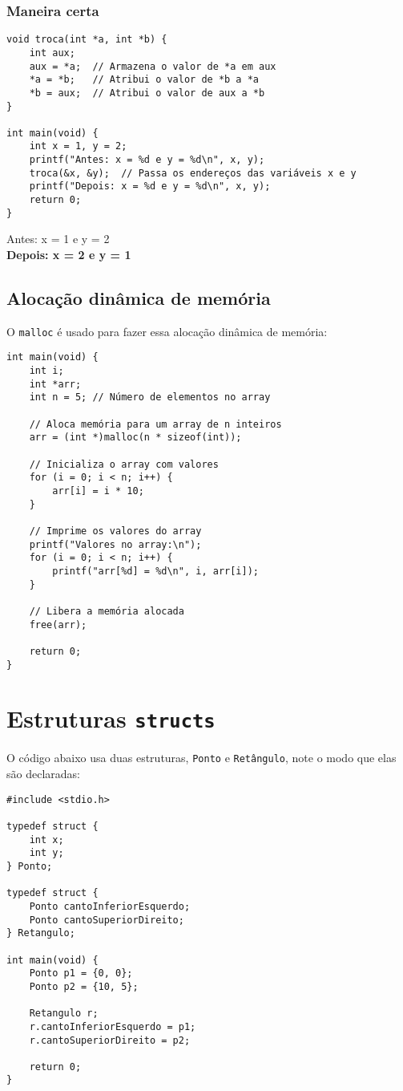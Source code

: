 \documentclass{article}
\begin{document}
\subsubsection{Maneira certa}
\begin{verbatim}
void troca(int *a, int *b) {
    int aux;
    aux = *a;  // Armazena o valor de *a em aux
    *a = *b;   // Atribui o valor de *b a *a
    *b = aux;  // Atribui o valor de aux a *b
}

int main(void) {
    int x = 1, y = 2;
    printf("Antes: x = %d e y = %d\n", x, y);
    troca(&x, &y);  // Passa os endereços das variáveis x e y
    printf("Depois: x = %d e y = %d\n", x, y);
    return 0;
}
\end{verbatim}
Antes: x = 1 e y = 2   \\
\textbf{Depois: x = 2 e y = 1}

\subsection{Alocação dinâmica de memória}

O \texttt{malloc} é usado para fazer essa alocação dinâmica de memória:

\begin{verbatim}
int main(void) {
    int i;
    int *arr;
    int n = 5; // Número de elementos no array

    // Aloca memória para um array de n inteiros
    arr = (int *)malloc(n * sizeof(int));
    
    // Inicializa o array com valores
    for (i = 0; i < n; i++) {
        arr[i] = i * 10;
    }

    // Imprime os valores do array
    printf("Valores no array:\n");
    for (i = 0; i < n; i++) {
        printf("arr[%d] = %d\n", i, arr[i]);
    }

    // Libera a memória alocada
    free(arr);

    return 0;
}
\end{verbatim}

\section{Estruturas \texttt{structs}}

O código abaixo usa duas estruturas, \texttt{Ponto} e \texttt{Retângulo}, note o modo que elas são declaradas:

\begin{verbatim}
#include <stdio.h>

typedef struct {
    int x;
    int y;
} Ponto;

typedef struct {
    Ponto cantoInferiorEsquerdo;
    Ponto cantoSuperiorDireito;
} Retangulo;

int main(void) {
    Ponto p1 = {0, 0};
    Ponto p2 = {10, 5};
    
    Retangulo r;
    r.cantoInferiorEsquerdo = p1;
    r.cantoSuperiorDireito = p2;
    
    return 0;
}
\end{verbatim}
\end{document}
